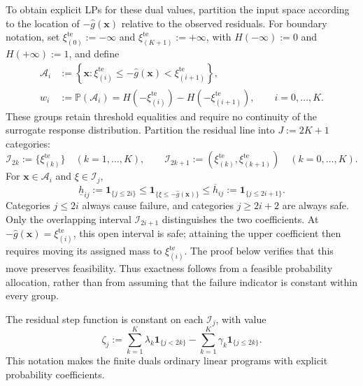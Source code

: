 \documentclass[review,11pt,3p,authoryear,nopreprintline]{elsarticle}
\begin{document}
To obtain explicit LPs for these dual values, partition the input space according to the location of $-\hat g(\bm x)$ relative to the observed residuals. For boundary notation, set $\xi_{(0)}^{\mathrm{te}}:=-\infty$ and $\xi_{(K+1)}^{\mathrm{te}}:=+\infty$, with $H(-\infty):=0$ and $H(+\infty):=1$, and define
\begin{equation}
  \begin{aligned}
    \mathcal A_i&:=\left\{\bm x:\xi_{(i)}^{\mathrm{te}}\le-\hat g(\bm x)<\xi_{(i+1)}^{\mathrm{te}}\right\},\\
    w_i&:=\mathbb P(\mathcal A_i)
    =H\left(-\xi_{(i)}^{\mathrm{te}}\right)-H\left(-\xi_{(i+1)}^{\mathrm{te}}\right),
    \qquad i=0,\ldots,K.
  \end{aligned}
  \label{eq-input-cells}
\end{equation}
These groups retain threshold equalities and require no continuity of the surrogate response distribution. Partition the residual line into $J:=2K+1$ categories:
\begin{equation}
  \mathcal I_{2k}:=\{\xi_{(k)}^{\mathrm{te}}\}\quad(k=1,\ldots,K),\qquad
  \mathcal I_{2k+1}:=(\xi_{(k)}^{\mathrm{te}},\xi_{(k+1)}^{\mathrm{te}})\quad(k=0,\ldots,K).
  \label{eq-residual-cells}
\end{equation}
For $\bm x\in \mathcal A_i$ and $\xi\in \mathcal I_j$,
\begin{equation}
  \underline h_{ij}:=\mathbf1_{\{j\le2i\}}
  \le\mathbf1_{\{\xi\le -\hat g(\bm x)\}}
  \le\overline h_{ij}:=\mathbf1_{\{j\le2i+1\}}.
  \label{eq-cell-costs}
\end{equation}
Categories $j\le2i$ always cause failure, and categories $j\ge2i+2$ are always safe. Only the overlapping interval $\mathcal I_{2i+1}$ distinguishes the two coefficients. At $-\hat g(\bm x)=\xi_{(i)}^{\mathrm{te}}$, this open interval is safe; attaining the upper coefficient then requires moving its assigned mass to $\xi_{(i)}^{\mathrm{te}}$. The proof below verifies that this move preserves feasibility. Thus exactness follows from a feasible probability allocation, rather than from assuming that the failure indicator is constant within every group.

The residual step function is constant on each $\mathcal I_j$, with value
\begin{equation}
  \zeta_j:=\sum_{k=1}^K\lambda_k\mathbf1_{\{j<2k\}}
    -\sum_{k=1}^K\gamma_k\mathbf1_{\{j\le2k\}}.
  \label{eq-dual-cell-values}
\end{equation}
This notation makes the finite duals ordinary linear programs with explicit probability coefficients.
\end{document}
